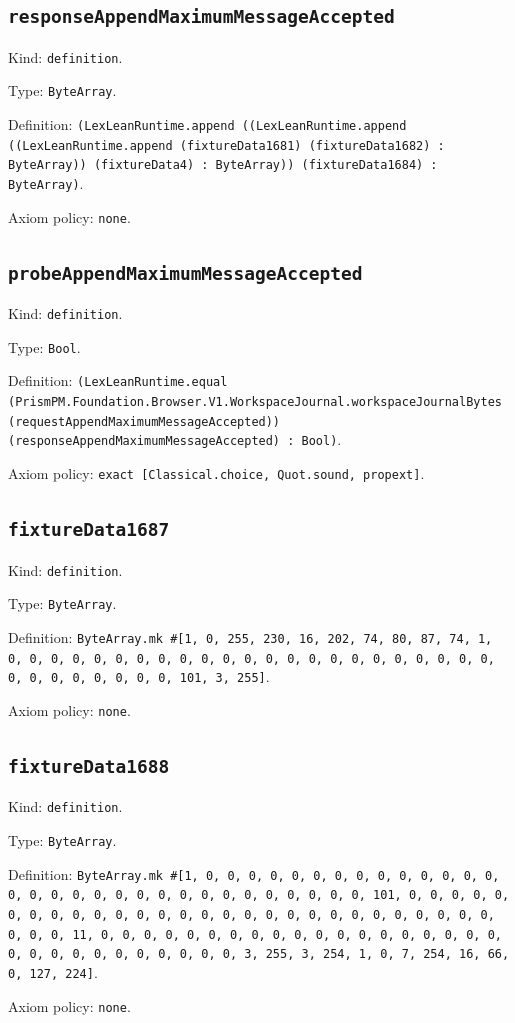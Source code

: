 \documentclass[11pt]{article}
\begin{document}
\subsection*{\texttt{responseAppendMaximumMessageAccepted}}
\noindent Kind: \texttt{definition}.\par
\noindent Type: \texttt{ByteArray}.\par
\noindent Definition: \texttt{(LexLeanRuntime.append ((LexLeanRuntime.append ((LexLeanRuntime.append (fixtureData1681) (fixtureData1682) : ByteArray)) (fixtureData4) : ByteArray)) (fixtureData1684) : ByteArray)}.\par
\noindent Axiom policy: \texttt{none}.\par
\subsection*{\texttt{probeAppendMaximumMessageAccepted}}
\noindent Kind: \texttt{definition}.\par
\noindent Type: \texttt{Bool}.\par
\noindent Definition: \texttt{(LexLeanRuntime.equal (PrismPM.Foundation.Browser.V1.WorkspaceJournal.workspaceJournalBytes (requestAppendMaximumMessageAccepted)) (responseAppendMaximumMessageAccepted) : Bool)}.\par
\noindent Axiom policy: \texttt{exact [Classical.choice, Quot.sound, propext]}.\par
\subsection*{\texttt{fixtureData1687}}
\noindent Kind: \texttt{definition}.\par
\noindent Type: \texttt{ByteArray}.\par
\noindent Definition: \texttt{ByteArray.mk \#[1, 0, 255, 230, 16, 202, 74, 80, 87, 74, 1, 0, 0, 0, 0, 0, 0, 0, 0, 0, 0, 0, 0, 0, 0, 0, 0, 0, 0, 0, 0, 0, 0, 0, 0, 0, 0, 0, 0, 0, 0, 0, 101, 3, 255]}.\par
\noindent Axiom policy: \texttt{none}.\par
\subsection*{\texttt{fixtureData1688}}
\noindent Kind: \texttt{definition}.\par
\noindent Type: \texttt{ByteArray}.\par
\noindent Definition: \texttt{ByteArray.mk \#[1, 0, 0, 0, 0, 0, 0, 0, 0, 0, 0, 0, 0, 0, 0, 0, 0, 0, 0, 0, 0, 0, 0, 0, 0, 0, 0, 0, 0, 0, 0, 0, 101, 0, 0, 0, 0, 0, 0, 0, 0, 0, 0, 0, 0, 0, 0, 0, 0, 0, 0, 0, 0, 0, 0, 0, 0, 0, 0, 0, 0, 0, 0, 0, 11, 0, 0, 0, 0, 0, 0, 0, 0, 0, 0, 0, 0, 0, 0, 0, 0, 0, 0, 0, 0, 0, 0, 0, 0, 0, 0, 0, 0, 0, 0, 3, 255, 3, 254, 1, 0, 7, 254, 16, 66, 0, 127, 224]}.\par
\noindent Axiom policy: \texttt{none}.\par
\end{document}
